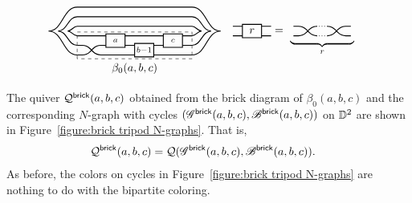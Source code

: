 \begin{align*}
&\begin{tikzpicture}[yshift=0.45cm,baseline=-.5ex,scale=0.6]
\draw[thick] (-3,-1)--(-1.5,-1) (-0.5,-1) -- (1.5, -1) (2.5,-1) -- (3,-1);
\draw[thick, rounded corners] (-3,-1.5) -- (-2.5,-1.5) -- (-2,-2) -- (0,-2) (-0.5,-1.5) -- (0, -1.5) (1, -1.5) -- (1.5,-1.5) (2.5, -1.5) -- (3,-1.5);
\draw[thick, rounded corners] (-3,-2) -- (-2.5,-2) -- (-2,-1.5) -- (-1.5,-1.5) (1,-2) -- (3,-2);
\draw[thick] (-1.5,-1.6) rectangle node {$\scriptstyle a$} (-0.5, -0.9) (0,-1.4) rectangle node {$\scriptstyle b-1$} (1,-2.1) (1.5,-0.9) rectangle node {$\scriptstyle c$} (2.5,-1.6);
\draw[thick] (-3,-1) to[out=180,in=0] (-3.5,-0.75) to[out=0,in=180] (-3,-0.5) -- (3,-0.5) to[out=0,in=180] (3.5,-0.75) to[out=180,in=0] (3,-1);
\draw[thick] (-3,-1.5) to[out=180,in=0] (-4,-0.75) to[out=0,in=180] (-3,0) -- (3,0) to[out=0,in=180] (4,-0.75) to[out=180,in=0] (3,-1.5);
\draw[thick] (-3,-2) to[out=180,in=0] (-4.5,-0.75) to[out=0,in=180] (-3,0.5) -- (3,0.5) to[out=0,in=180] (4.5,-0.75) to[out=180,in=0] (3,-2);
\draw[dashed] (-3,-2.2) rectangle (3,-0.8) (0,-2.2) node[below] {$\beta_0(a,b,c)$};
\end{tikzpicture}&
\begin{tikzpicture}[baseline=-.5ex,scale=0.6]
\draw[thick] (-1.5,-0.25) -- (-1,-0.25) (-1.5,0.25) -- (-1,0.25) (0.5,-0.25) -- (0,-0.25) (0.5,0.25) -- (0,0.25) (-1,-0.35) rectangle node {$r$} (0,0.35);
\end{tikzpicture}&=
\begin{tikzpicture}[baseline=-.5ex,scale=0.6]
\draw[thick, rounded corners] (-1.5,0.25) -- (-1,0.25) -- (-0.5, -0.25) -- (-0.3, -0.25) (-1.5,-0.25) -- (-1,-0.25) -- (-0.5, 0.25) -- (-0.3, 0.25) (1.5,0.25) -- (1,0.25) -- (0.5, -0.25) -- (0.3, -0.25) (1.5,-0.25) -- (1,-0.25) -- (0.5, 0.25) -- (0.3, 0.25);
\draw[line cap=round, dotted] (-0.3,0.25) -- (0.3,0.25) (-0.3,-0.25) -- node[below] {$\underbrace{\hphantom{\hspace{2cm}}}_r$} (0.3,-0.25);
\end{tikzpicture}
\end{align*}

The quiver $\mathcal{Q}^{\mathsf{brick}}(a,b,c)$ obtained from the brick diagram of $\beta_0(a,b,c)$ and the corresponding $N$-graph with cycles $(\mathscr{G}^{\mathsf{brick}}(a,b,c),\mathscr{B}^{\mathsf{brick}}(a,b,c))$ on $\mathbb{D}^2$ are shown in Figure~\ref{figure:brick tripod N-graphs}.
That is, 
\begin{align*}
\mathcal{Q}^{\mathsf{brick}}(a,b,c)&=
\mathcal{Q}(\mathscr{G}^{\mathsf{brick}}(a,b,c), \mathscr{B}^{\mathsf{brick}}(a,b,c)).
\end{align*}
As before, the colors on cycles in Figure~\ref{figure:brick tripod N-graphs} are nothing to do with the bipartite coloring.

